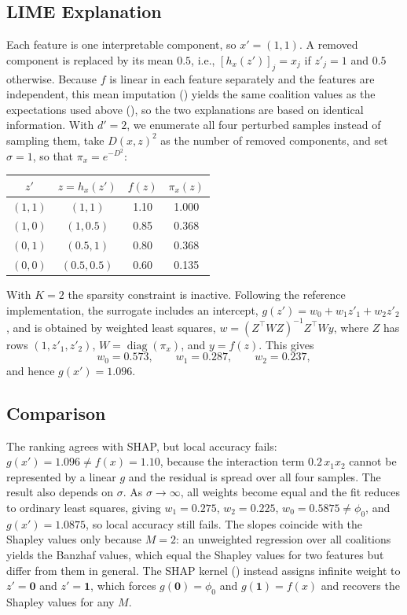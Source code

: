 \subsection{LIME Explanation}
Each feature is one interpretable component, so $x' = (1, 1)$. A removed component is replaced by its mean $0.5$, i.e., $[h_x(z')]_j = x_j$ if $z'_j = 1$ and $0.5$ otherwise. Because $f$ is linear in each feature separately and the features are independent, this mean imputation () yields the same coalition values as the expectations used above (), so the two explanations are based on identical information. With $d' = 2$, we enumerate all four perturbed samples instead of sampling them, take $D(x, z)^2$ as the number of removed components, and set $\sigma = 1$, so that $\pi_x = e^{-D^2}$:
\begin{center}
    \footnotesize
    \begin{tabular}{@{}cccc@{}}
        \toprule
        $z'$ & $z = h_x(z')$ & $f(z)$ & $\pi_x(z)$ \\
        \midrule
        $(1,1)$ & $(1, 1)$ & 1.10 & 1.000 \\
        $(1,0)$ & $(1, 0.5)$ & 0.85 & 0.368 \\
        $(0,1)$ & $(0.5, 1)$ & 0.80 & 0.368 \\
        $(0,0)$ & $(0.5, 0.5)$ & 0.60 & 0.135 \\
        \bottomrule
    \end{tabular}
\end{center}
With $K = 2$ the sparsity constraint is inactive. Following the reference implementation, the surrogate includes an intercept, $g(z') = w_0 + w_1 z'_1 + w_2 z'_2$, and is obtained by weighted least squares, $w = (Z^\top W Z)^{-1} Z^\top W y$, where $Z$ has rows $(1, z'_1, z'_2)$, $W = \operatorname{diag}(\pi_x)$, and $y = f(z)$. This gives
\begin{equation}
    w_0 = 0.573, \qquad w_1 = 0.287, \qquad w_2 = 0.237,
\end{equation}
and hence $g(x') = 1.096$.

\subsection{Comparison}
The ranking agrees with SHAP, but local accuracy fails: $g(x') = 1.096 \neq f(x) = 1.10$, because the interaction term $0.2\,x_1 x_2$ cannot be represented by a linear $g$ and the residual is spread over all four samples. The result also depends on $\sigma$. As $\sigma \to \infty$, all weights become equal and the fit reduces to ordinary least squares, giving $w_1 = 0.275$, $w_2 = 0.225$, $w_0 = 0.5875 \neq \phi_0$, and $g(x') = 1.0875$, so local accuracy still fails. The slopes coincide with the Shapley values only because $M = 2$: an unweighted regression over all coalitions yields the Banzhaf values, which equal the Shapley values for two features but differ from them in general. The SHAP kernel () instead assigns infinite weight to $z' = \mathbf{0}$ and $z' = \mathbf{1}$, which forces $g(\mathbf{0}) = \phi_0$ and $g(\mathbf{1}) = f(x)$ and recovers the Shapley values for any $M$.

